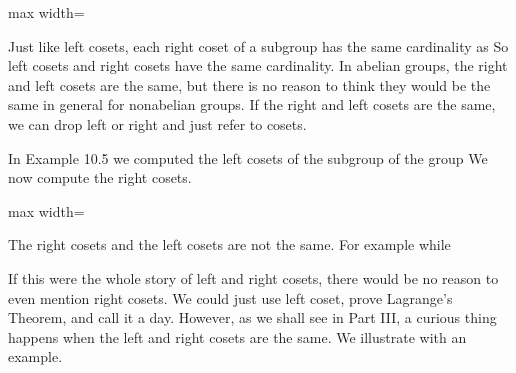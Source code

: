 \documentclass[11pt,oneside]{article}
\begin{document}
\begin{BookBody}
\begin{center}\begin{adjustbox}{max width=\linewidth}\end{adjustbox}\end{center}

\noindent Just like left cosets, each right coset of a subgroup  has the same cardinality as  So left cosets and right cosets have the same cardinality. In abelian groups, the right and left cosets are the same, but there is no reason to think they would be the same in general for nonabelian groups. If the right and left cosets are the same, we can drop left or right and just refer to cosets.

 In Example 10.5 we computed the left cosets of the subgroup  of the group  We now compute the right cosets.

\begin{center}\begin{adjustbox}{max width=\linewidth}\end{adjustbox}\end{center}

\noindent The right cosets and the left cosets are not the same. For example while \BookEnd{\blacktriangle}

\noindent If this were the whole story of left and right cosets, there would be no reason to even mention right cosets. We could just use left coset, prove Lagrange’s Theorem, and call it a day. However, as we shall see in Part III, a curious thing happens when the left and right cosets are the same. We illustrate with an example.


\end{BookBody}
\end{document}
